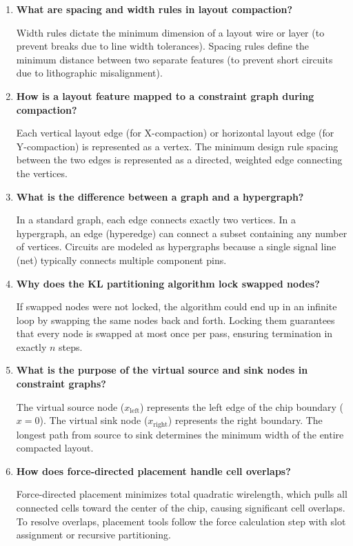 \documentclass[12pt,a4paper]{article}
\newcommand{\Q}[1]{\textbf{#1}\par\noindent\ignorespaces}
\begin{document}
\begin{tcolorbox}[exambox, title={\textbf{Frequently Asked / Viva Questions}}]
\begin{enumerate}[leftmargin=*, topsep=0pt, label=\textbf{Q\arabic*.}, itemsep=6pt]
  \item \Q{What are spacing and width rules in layout compaction?}
        Width rules dictate the minimum dimension of a layout wire or layer (to prevent breaks due to line width tolerances). Spacing rules define the minimum distance between two separate features (to prevent short circuits due to lithographic misalignment).
        
  \item \Q{How is a layout feature mapped to a constraint graph during compaction?}
        Each vertical layout edge (for X-compaction) or horizontal layout edge (for Y-compaction) is represented as a vertex. The minimum design rule spacing between the two edges is represented as a directed, weighted edge connecting the vertices.
        
  \item \Q{What is the difference between a graph and a hypergraph?}
        In a standard graph, each edge connects exactly two vertices. In a hypergraph, an edge (hyperedge) can connect a subset containing any number of vertices. Circuits are modeled as hypergraphs because a single signal line (net) typically connects multiple component pins.
        
  \item \Q{Why does the KL partitioning algorithm lock swapped nodes?}
        If swapped nodes were not locked, the algorithm could end up in an infinite loop by swapping the same nodes back and forth. Locking them guarantees that every node is swapped at most once per pass, ensuring termination in exactly $n$ steps.
        
  \item \Q{What is the purpose of the virtual source and sink nodes in constraint graphs?}
        The virtual source node ($x_{\text{left}}$) represents the left edge of the chip boundary ($x = 0$). The virtual sink node ($x_{\text{right}}$) represents the right boundary. The longest path from source to sink determines the minimum width of the entire compacted layout.
        
  \item \Q{How does force-directed placement handle cell overlaps?}
        Force-directed placement minimizes total quadratic wirelength, which pulls all connected cells toward the center of the chip, causing significant cell overlaps. To resolve overlaps, placement tools follow the force calculation step with slot assignment or recursive partitioning.
        

\end{enumerate}
\end{tcolorbox}
\end{document}
